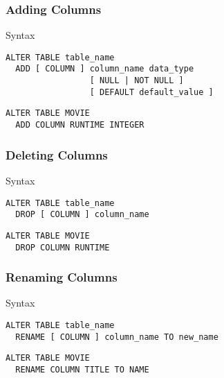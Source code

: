 \documentclass[dvipsnames]{beamer}
\theoremstyle{plain}
\begin{document}
\begin{frame}[fragile]
  \frametitle{Adding Columns}

  \begin{block}{Syntax}
    \begin{lstlisting}
ALTER TABLE table_name
  ADD [ COLUMN ] column_name data_type
                 [ NULL | NOT NULL ]
                 [ DEFAULT default_value ]
    \end{lstlisting}
  \end{block}

  \medskip
  \begin{example}
    \begin{lstlisting}
ALTER TABLE MOVIE
  ADD COLUMN RUNTIME INTEGER
    \end{lstlisting}
  \end{example}
\end{frame}

\begin{frame}[fragile]
  \frametitle{Deleting Columns}

  \begin{block}{Syntax}
    \begin{lstlisting}
ALTER TABLE table_name
  DROP [ COLUMN ] column_name
    \end{lstlisting}
  \end{block}

  \medskip
  \begin{example}
    \begin{lstlisting}
ALTER TABLE MOVIE
  DROP COLUMN RUNTIME
    \end{lstlisting}
  \end{example}
\end{frame}

\begin{frame}[fragile]
  \frametitle{Renaming Columns}

  \begin{block}{Syntax}
    \begin{lstlisting}
ALTER TABLE table_name
  RENAME [ COLUMN ] column_name TO new_name
    \end{lstlisting}
  \end{block}

  \medskip
  \begin{example}
    \begin{lstlisting}
ALTER TABLE MOVIE
  RENAME COLUMN TITLE TO NAME
    \end{lstlisting}
  \end{example}
\end{frame}
\end{document}
